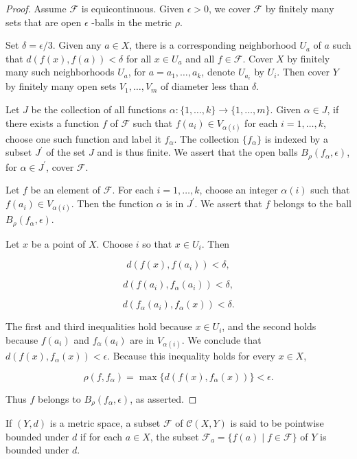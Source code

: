 \begin{proof}
Assume \(\mathcal{F}\) is equicontinuous. Given \(\epsilon > 0\), we cover \(\mathcal{F}\) by finitely many sets that are open \(\epsilon\) -balls in the metric \(\rho\).

Set \(\delta = \epsilon /3\). Given any \(a \in X\), there is a corresponding neighborhood \(U_{a}\) of \(a\) such that \(d({f(x),f( a) }) < \delta\) for all \(x \in {U}_{a}\) and all \(f \in \mathcal{F}\). Cover \(X\) by finitely many such neighborhoods \(U_{a}\), for \(a = a_{1},\ldots ,a_{k}\), denote \(U_{a_{i}}\) by \(U_{i}\). Then cover \(Y\) by finitely many open sets \(V_{1},\ldots ,V_{m}\) of diameter less than \(\delta\).

Let \(J\) be the collection of all functions \(\alpha : \{ 1,\ldots, k\} \rightarrow \{ 1,\ldots, m\}\). Given \(\alpha \in J\), if there exists a function \(f\) of \(\mathcal{F}\) such that \(f(a_{i}) \in {V}_{\alpha (i) }\) for each \(i = 1,\ldots, k\), choose one such function and label it \(f_{\alpha }\). The collection \(\{ f_{\alpha }\}\) is indexed by a subset \(J^{\prime }\) of the set \(J\) and is thus finite. We assert that the open balls \(B_{\rho }({f_{\alpha },\epsilon })\), for \(\alpha \in {J}^{\prime }\), cover \(\mathcal{F}\).

Let \(f\) be an element of \(\mathcal{F}\). For each \(i = 1,\ldots, k\), choose an integer \(\alpha (i)\) such that \(f(a_{i}) \in {V}_{\alpha (i) }\). Then the function \(\alpha\) is in \(J^{\prime }\). We assert that \(f\) belongs to the ball \(B_{\rho }({f_{\alpha },\epsilon })\).

Let \(x\) be a point of \(X\). Choose \(i\) so that \(x \in {U}_{i}\). Then

\[
d({f(x),f(a_{i}) }) < \delta ,
\]

\[
d({f(a_{i}),f_{\alpha }(a_{i}) }) < \delta ,
\]

\[
d({f_{\alpha }(a_{i}),f_{\alpha }(x) }) < \delta .
\]

The first and third inequalities hold because \(x \in {U}_{i}\), and the second holds because \(f(a_{i})\) and \(f_{\alpha }(a_{i})\) are in \(V_{\alpha (i) }\). We conclude that \(d({f(x),f_{\alpha }(x) }) < \epsilon\). Because this inequality holds for every \(x \in X\),

\[
\rho ({f,f_{\alpha }}) = \max \{ {d({f(x),f_{\alpha }(x) }) }\} < \epsilon .
\]

Thus \(f\) belongs to \(B_{\rho }({f_{\alpha },\epsilon })\), as asserted.
\end{proof}

\begin{definition}
If \((Y, d)\) is a metric space, a subset \(\mathcal{F}\) of \(\mathcal{C}({X,Y})\) is said to be pointwise bounded under \(d\) if for each \(a \in X\), the subset \(\mathcal{F}_{a} = \{ f( a) \mid f \in \mathcal{F}\}\) of \(Y\) is bounded under \(d\).
\end{definition}

